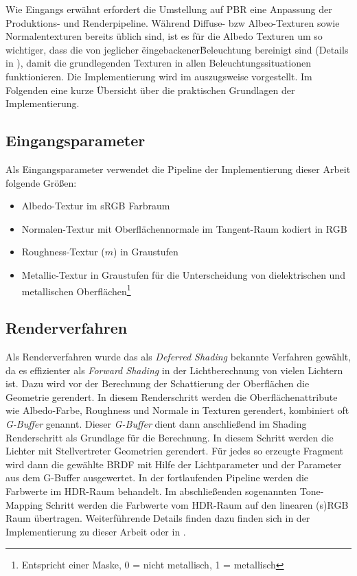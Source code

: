 Wie Eingangs erwähnt erfordert die Umstellung auf \ac{PBR} eine Anpassung der Produktions- und Renderpipeline. Während Diffuse- bzw Albeo-Texturen sowie Normalentexturen bereits üblich sind, ist es für die Albedo Texturen um so wichtiger, dass die von jeglicher \"eingebackener\" Beleuchtung bereinigt sind (Details in \cite{Lagarde2011}), damit die grundlegenden Texturen in allen Beleuchtungssituationen funktionieren. Die Implementierung wird im  auszugsweise vorgestellt. Im Folgenden eine kurze Übersicht über die praktischen Grundlagen der Implementierung.

\subsection{Eingangsparameter}

Als Eingangsparameter verwendet die Pipeline der Implementierung dieser Arbeit folgende Größen:
\begin{itemize}
\item Albedo-Textur im sRGB Farbraum
\item Normalen-Textur mit Oberflächennormale im Tangent-Raum kodiert in RGB
\item Roughness-Textur ($m$) in Graustufen
\item Metallic-Textur in Graustufen für die Unterscheidung von dielektrischen und metallischen Oberflächen\footnote{Entspricht einer Maske, 0 = nicht metallisch, 1 = metallisch}
\end{itemize}

\subsection{Renderverfahren}

Als Renderverfahren wurde das als \textit{Deferred Shading} bekannte Verfahren gewählt, da es effizienter als \textit{Forward Shading} in der Lichtberechnung von vielen Lichtern ist. Dazu wird vor der Berechnung der Schattierung der Oberflächen die Geometrie gerendert. In diesem Renderschritt werden die Oberflächenattribute wie Albedo-Farbe, Roughness und Normale in Texturen gerendert, kombiniert oft \textit{G-Buffer} genannt. Dieser \textit{G-Buffer} dient dann anschließend im Shading Renderschritt als Grundlage für die Berechnung. In diesem Schritt werden die Lichter mit Stellvertreter Geometrien gerendert. Für jedes so erzeugte Fragment wird dann die gewählte \ac{BRDF} mit Hilfe der Lichtparameter und der Parameter aus dem G-Buffer ausgewertet. In der fortlaufenden Pipeline werden die Farbwerte im HDR-Raum behandelt. Im abschließenden sogenannten Tone-Mapping Schritt werden die Farbwerte vom HDR-Raum auf den linearen (s)RGB Raum übertragen. Weiterführende Details finden dazu finden sich in der Implementierung zu dieser Arbeit oder in \cite{Shishkovtsov2005}.

